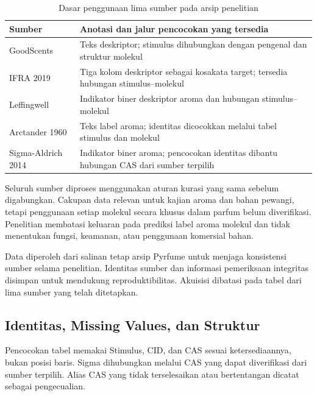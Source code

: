 \begin{table}[htbp]
\centering
\caption{Dasar penggunaan lima sumber pada arsip penelitian}
\label{tab:inklusi_sumber}
\small
\begin{tabular}{>{\raggedright\arraybackslash}p{}>{\raggedright\arraybackslash}p{}}
\toprule
Sumber & Anotasi dan jalur pencocokan yang tersedia \\
\midrule
GoodScents & Teks deskriptor; stimulus dihubungkan dengan pengenal dan struktur molekul \\
IFRA 2019 & Tiga kolom deskriptor sebagai kosakata target; tersedia hubungan stimulus--molekul \\
Leffingwell & Indikator biner deskriptor aroma dan hubungan stimulus--molekul \\
Arctander 1960 & Teks label aroma; identitas dicocokkan melalui tabel stimulus dan molekul \\
Sigma-Aldrich 2014 & Indikator biner aroma; pencocokan identitas dibantu hubungan CAS dari sumber terpilih \\
\bottomrule
\end{tabular}
\end{table}

Seluruh sumber diproses menggunakan aturan kurasi yang sama sebelum digabungkan. Cakupan data relevan untuk kajian aroma dan bahan pewangi, tetapi penggunaan setiap molekul secara khusus dalam parfum belum diverifikasi. Penelitian membatasi keluaran pada prediksi label aroma molekul dan tidak menentukan fungsi, keamanan, atau penggunaan komersial bahan.

Data diperoleh dari salinan tetap arsip Pyrfume untuk menjaga konsistensi sumber selama penelitian. Identitas sumber dan informasi pemeriksaan integritas disimpan untuk mendukung reproduktibilitas. Akuisisi dibatasi pada tabel dari lima sumber yang telah ditetapkan.

\subsection{Identitas, Missing Values, dan Struktur}
Pencocokan tabel memakai Stimulus, CID, dan CAS sesuai ketersediaannya, bukan posisi baris. Sigma dihubungkan melalui CAS yang dapat diverifikasi dari sumber terpilih. Alias CAS yang tidak terselesaikan atau bertentangan dicatat sebagai pengecualian.

